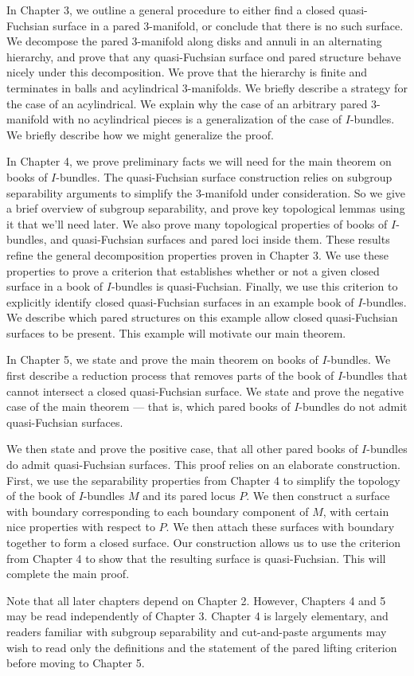 In Chapter 3, we outline a general procedure to either find a closed
quasi-Fuchsian surface in a pared 3-manifold, or conclude that there is no such
surface.  We decompose the pared 3-manifold along disks and annuli in an
alternating hierarchy, and prove that any quasi-Fuchsian surface ond pared
structure behave nicely under this decomposition. We prove that the hierarchy
is finite and terminates in balls and acylindrical 3-manifolds. We briefly
describe a strategy for the case of an acylindrical. We explain why the case of
an arbitrary pared 3-manifold with no acylindrical pieces is a generalization
of the case of $I$-bundles. We briefly describe how we might generalize the
proof.

In Chapter 4, we prove preliminary facts we will need for the main theorem on
books of $I$-bundles. The quasi-Fuchsian surface construction relies on
subgroup separability arguments to simplify the 3-manifold under consideration.
So we give a brief overview of subgroup separability, and prove key topological
lemmas using it that we'll need later. We also prove many topological
properties of books of $I$-bundles, and quasi-Fuchsian surfaces and pared loci
inside them.  These results refine the general decomposition properties proven
in Chapter 3.  We use these properties to prove a criterion that establishes
whether or not a given closed surface in a book of $I$-bundles is
quasi-Fuchsian.  Finally, we use this criterion to explicitly identify closed
quasi-Fuchsian surfaces in an example book of $I$-bundles. We describe which
pared structures on this example allow closed quasi-Fuchsian surfaces to be
present. This example will motivate our main theorem.

In Chapter 5, we state and prove the main theorem on books of $I$-bundles. We
first describe a reduction process that removes parts of the book of
$I$-bundles that cannot intersect a closed quasi-Fuchsian surface. We state and
prove the negative case of the main theorem --- that is, which pared books of
$I$-bundles do not admit quasi-Fuchsian surfaces.

We then state and prove the positive case, that all other pared books of
$I$-bundles do admit quasi-Fuchsian surfaces. This proof relies on an elaborate
construction. First, we use the separability properties from Chapter 4 to
simplify the topology of the book of $I$-bundles $M$ and its pared locus $P$.
We then construct a surface with boundary corresponding to each boundary
component of $M$, with certain nice properties with respect to $P$. We then
attach these surfaces with boundary together to form a closed surface. Our
construction allows us to use the criterion from Chapter 4 to show that the
resulting surface is quasi-Fuchsian. This will complete the main proof.

Note that all later chapters depend on Chapter 2. However, Chapters 4 and 5 may
be read independently of Chapter 3. Chapter 4 is largely elementary, and
readers familiar with subgroup separability and cut-and-paste arguments may
wish to read only the definitions and the statement of the pared lifting
criterion before moving to Chapter 5.

